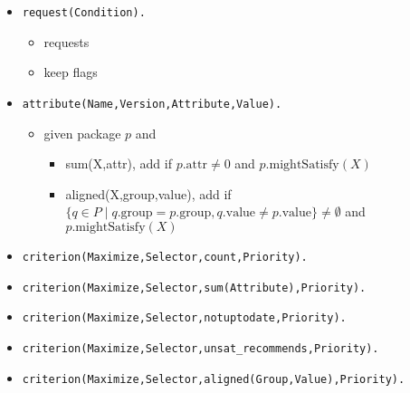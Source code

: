\documentclass[a4paper,english]{article}
\begin{document}
\begin{itemize}
\begin{itemize}
    \end{itemize}
  \item \texttt{request(Condition).}
    \begin{itemize}
      \item requests
      \item keep flags
    \end{itemize}
  \item \texttt{attribute(Name,Version,Attribute,Value).}
    \begin{itemize}
      \item given package $p$ and
        \begin{itemize}
          \item sum(X,attr), add if $p.\mathrm{attr}\not=0$ and $p.\mathrm{mightSatisfy}(X)$
          \item aligned(X,group,value), add if $\{q\in P \mid q.\mathrm{group} = p.\mathrm{group}, q.\mathrm{value} \neq p.\mathrm{value}\}\not=\emptyset$ and $p.\mathrm{mightSatisfy}(X)$
        \end{itemize}
    \end{itemize}
  \item \texttt{criterion(Maximize,Selector,count,Priority).}
  \item \texttt{criterion(Maximize,Selector,sum(Attribute),Priority).}
  \item \texttt{criterion(Maximize,Selector,notuptodate,Priority).}
  \item \texttt{criterion(Maximize,Selector,unsat\_recommends,Priority).}
  \item \texttt{criterion(Maximize,Selector,aligned(Group,Value),Priority).}
\end{itemize}
\end{document}
